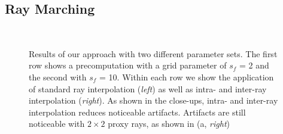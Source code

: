 \documentclass[journal]{vgtc}                %
\begin{document}
\subsection{Ray Marching}
\begin{figure}[t]
    \centering
    \\
    \caption{Results of our approach with two different parameter sets. The first row shows a precomputation with a grid parameter of $s_f$ = 2 and the second with $s_f$ = 10. Within each row we show the application of standard ray interpolation ({\it left}) as well as intra- and inter-ray interpolation ({\it right}). As shown in the close-ups, intra- and inter-ray interpolation reduces noticeable artifacts. Artifacts are still noticeable with $2 \times 2$ proxy rays, as shown in ({a, \it right})}
    \label{fig:rayinterpolation}
\end{figure}
\end{document}
